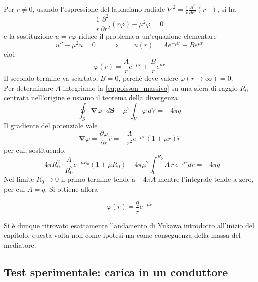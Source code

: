 Per $r \neq 0$, usando l'espressione del laplaciano radiale $\nabla^2 = \frac{1}{r}\frac{\partial^2}{\partial r^2}(r \, \cdot)$, si ha
%
\begin{equation*}
    \frac{1}{r}\frac{\partial^2}{\partial r^2}\left(r \varphi\right) - \mu^2 \varphi = 0
\end{equation*}
e la sostituzione $u = r\varphi$ riduce il problema a un'equazione elementare
%
\begin{equation}
    u'' - \mu^2 u = 0 \qquad \Longrightarrow \qquad u(r) = A e^{-\mu r} + B e^{\mu r}
\end{equation}
cioè
%
\begin{equation*}
    \varphi(r) = \frac{A}{r}e^{-\mu r} + \frac{B}{r}e^{\mu r}
\end{equation*}
Il secondo termine va scartato, $B = 0$, perché deve valere $\varphi(r\to\infty) = 0$.\\

Per determinare $A$ integriamo la \eqref{eq:poisson_massivo} su una sfera di raggio $R_0$ centrata nell'origine e usiamo il teorema della divergenza
%
\begin{equation*}
    \oint_{S} \mathbf{\nabla}\varphi \cdot d\mathbf{S} - \mu^2 \int_V \varphi \, dV = -4\pi q
\end{equation*}
Il gradiente del potenziale vale
%
\begin{equation}
    \mathbf{\nabla}\varphi = \frac{\partial \varphi}{\partial r}\hat{r} = -\frac{A}{r^2}e^{-\mu r}\left(1 + \mu r\right)\hat{r}
    \label{eq:gradiente}
\end{equation}
per cui, sostituendo,
%
\begin{equation*}
    -4\pi R_0^2 \cdot \frac{A}{R_0^2}e^{-\mu R_0}(1+\mu R_0) - 4\pi\mu^2 \int_0^{R_0} A \, r \, e^{-\mu r} dr = -4\pi q
\end{equation*}
Nel limite $R_0 \to 0$ il primo termine tende a $-4\pi A$ mentre l'integrale tende a zero, per cui $A = q$. Si ottiene allora

\begin{tcolorbox}[colback=black!5!white, colframe=black!45!white, boxrule=0.8pt]
\begin{equation}
    \varphi(r) = \frac{q}{r}e^{-\mu r}
\end{equation}
\end{tcolorbox}
Si è dunque ritrovato esattamente l'andamento di Yukawa introdotto all'inizio del capitolo, questa volta non come ipotesi ma come conseguenza della massa del mediatore.

\subsection{Test sperimentale: carica in un conduttore}

